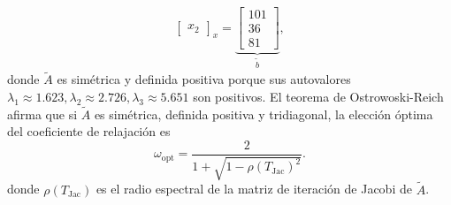 \begin{frame}
\begin{solution}
\begin{enumerate}[b)]
\begin{align*}
{\begin{bmatrix}
						      x_{2}
					      \end{bmatrix}
				      }_{\displaystyle x}
				      =
				      \underbrace{
					      \begin{bmatrix}
						      101 \\
						      36  \\
						      81
					      \end{bmatrix}
				      }_{\displaystyle \widetilde{b}},
			      \end{align*}
			      donde $\widetilde{A}$ es \alert{simétrica} y
			      \alert{definida positiva} porque sus autovalores
			      \begin{math}
				      \lambda_{1}\approx 1.623,
				      \lambda_{2}\approx 2.726,
				      \lambda_{3}\approx 5.651
			      \end{math}
			      son positivos.
			      El teorema de \alert{Ostrowoski-Reich} afirma que si
			      $\widetilde{A}$ es simétrica, definida positiva y
			      tridiagonal, la elección óptima del
			      coeficiente de relajación es
			      \begin{equation*}
				      \omega_{\text{opt}}=
				      \dfrac{2}{
				      1+
				      \sqrt{1-{\rho\left(T_{\text{Jac}}\right)}^{2}}
				      }.
			      \end{equation*}
			      donde \begin{math}
				      \rho\left(T_{\text{Jac}}\right)
			      \end{math}
			      es el radio espectral de la matriz de iteración de
			      Jacobi de $\widetilde{A}$.
		\end{enumerate}
	\end{solution}
\end{frame}

